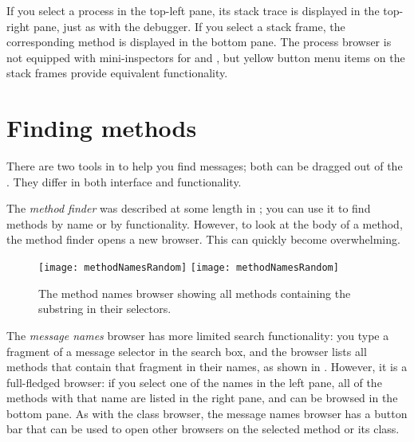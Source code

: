 \documentclass[a4paper,10pt,twoside]{book}
\begin{document}
If you select a process in the top-left pane, its stack trace is displayed in the top-right pane, just as with the debugger.
If you select a stack frame, the corresponding method is displayed in the bottom pane.
The process browser is not equipped with mini-inspectors for \self and , but yellow button menu items on the stack frames provide equivalent functionality.



\section{Finding methods}
\label{sec:methodFinder} 

There are two tools in \sq to help you find messages; both can be dragged out of the \toolsflapind.
They differ in both interface and functionality.

The \emph{method finder} was described at some length in ; you can use it to find methods by name or by functionality. 
However, to look at the body of a method, the method finder opens a new browser.
This can quickly become overwhelming.

\begin{figure}[btp]
	\begin{center}
	\ifluluelse
		{\texttt{[image: methodNamesRandom]}}
		{\texttt{[image: methodNamesRandom]}}
	\end{center}
	\caption{The method names browser showing all methods containing the substring  in their selectors.}
	\label{fig:methodNamesRandom}
\end{figure}

The \emph{message names} browser has more limited search functionality: you type a fragment of a message selector in the search box, and the browser lists all methods that contain that fragment in their names, as shown in .
However, it is a full-fledged browser:
if you select one of the names in the left pane, all of the methods with that name are listed in the right pane, and can be browsed in the bottom pane.
As with the class browser, the message names browser has a button bar that can be used to open other  browsers on the selected method or its class.
\end{document}
